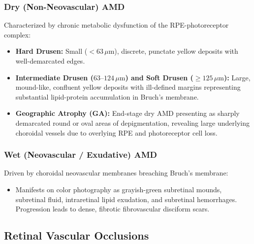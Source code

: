 \documentclass[11pt,a4paper]{article}
\begin{document}
\subsubsection{Dry (Non-Neovascular) AMD}
Characterized by chronic metabolic dysfunction of the RPE-photoreceptor complex:
\begin{itemize}[leftmargin=*]
    \item \textbf{Hard Drusen:} Small ($< 63\,\mu\text{m}$), discrete, punctate yellow deposits with well-demarcated edges.
    \item \textbf{Intermediate Drusen ($63\text{--}124\,\mu\text{m}$) and Soft Drusen ($\ge 125\,\mu\text{m}$):} Large, mound-like, confluent yellow deposits with ill-defined margins representing substantial lipid-protein accumulation in Bruch's membrane.
    \item \textbf{Geographic Atrophy (GA):} End-stage dry AMD presenting as sharply demarcated round or oval areas of depigmentation, revealing large underlying choroidal vessels due to overlying RPE and photoreceptor cell loss.
\end{itemize}

\subsubsection{Wet (Neovascular / Exudative) AMD}
Driven by choroidal neovascular membranes breaching Bruch's membrane:
\begin{itemize}[leftmargin=*]
    \item Manifests on color photography as grayish-green subretinal mounds, subretinal fluid, intraretinal lipid exudation, and subretinal hemorrhages. Progression leads to dense, fibrotic fibrovascular disciform scars.
\end{itemize}

\subsection{Retinal Vascular Occlusions}
\end{document}
